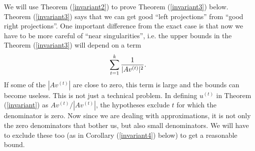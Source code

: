 \documentclass{book}
\numberwithin{exercise}{chapter}
\newtheorem{remark}[theorem]{Remark}
\begin{document}
We will use Theorem (\ref{invariant2}) to prove Theorem (\ref{invariant3}) below.
Theorem (\ref{invariant3}) says that we can get good ``left projections'' from ``good
right projections''. One important difference from the exact case is that now we have to be
more careful of ``near singularities'', i.e. the upper bounds in the Theorem (\ref{invariant3})
will depend on a term
$$\sum_{t=1}^k{1\over |Av^{(t)}|^2}.$$
If some of the $|Av^{(t)}|$ are close to zero, this term is large and the bounds can become useless.
This is not just a technical problem. In defining $u^{(t)}$ in Theorem (\ref{invariant}) as
$Av^{(t)}/|Av^{(t)}|$, the hypotheses exclude $t$ for which the denominator is zero. Now
since we are dealing with approximations, it is not only the zero denominators that bother us, but also
small denominators. We will have to exclude these too (as in Corollary (\ref{invariant4}) below) to get
a reasonable bound.

\end{document}
